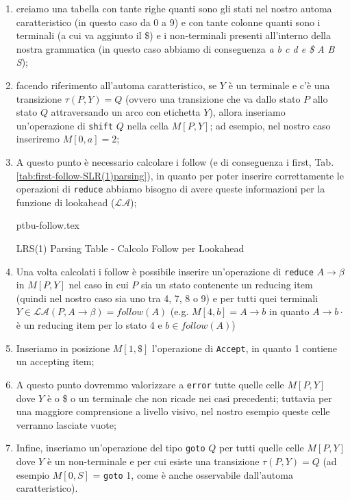 \documentclass[class=book, crop=false, oneside, 12pt]{standalone}
\begin{document}
\begin{enumerate}
    \item creiamo una tabella con tante righe quanti sono gli stati nel nostro automa caratteristico (in questo caso da 0 a 9) e con tante colonne quanti sono i terminali (a cui va aggiunto il \$) e i non-terminali presenti all'interno della nostra grammatica (in questo caso abbiamo di conseguenza \emph{a b c d e \$ A B S});
    \item facendo riferimento all'automa caratteristico, se \(Y\) è un terminale e c'è una transizione \(\tau (P, Y) = Q\) (ovvero una transizione che va dallo stato \(P\) allo stato \(Q\) attraversando un arco con etichetta \(Y\)), allora inseriamo un'operazione di \texttt{shift} \(Q\) nella cella \(M[P, Y]\); ad esempio, nel nostro caso inseriremo \(M[0, a] = 2\);
    \item A questo punto è necessario calcolare i follow (e di conseguenza i first, Tab.\ref{tab:first-follow-SLR(1)parsing}), in quanto per poter inserire correttamente le operazioni di \texttt{reduce} abbiamo bisogno di avere queste informazioni per la funzione di lookahead (\(\mathcal{LA}\));
\begin{table}[H]
    \centering
    {ptbu-follow.tex}
    \caption{LRS(1) Parsing Table - Calcolo Follow per Lookahead}
    \label{tab:first-follow-SLR(1)parsing}
\end{table}
    \item Una volta calcolati i follow è possibile inserire un'operazione di \texttt{reduce} \(A \rightarrow \beta\) in \(M[P, Y]\) nel caso in cui \(P\) sia un stato contenente un reducing item (quindi nel nostro caso sia uno tra 4, 7, 8 o 9) e per tutti quei terminali \(Y \in \mathcal{LA}(P, A \rightarrow \beta) = follow(A)\) (e.g. \(M[4, b] = A \rightarrow b\) in quanto \(A \rightarrow b \cdot\) è un reducing item per lo stato 4 e \(b \in follow(A)\))
    \item Inseriamo in posizione \(M[1, \$]\) l'operazione di \texttt{Accept}, in quanto 1 contiene un accepting item;
    \item A questo punto dovremmo valorizzare a \texttt{error} tutte quelle celle \(M[P, Y]\) dove \(Y\) è o \$ o un terminale che non ricade nei casi precedenti; tuttavia per una maggiore comprensione a livello visivo, nel nostro esempio queste celle verranno lasciate vuote;
    \item Infine, inseriamo un'operazione del tipo \texttt{goto} \(Q\) per tutti quelle celle \(M[P, Y]\) dove \(Y\) è un non-terminale e per cui esiste una transizione \(\tau(P, Y) = Q\) (ad esempio \(M[0, S]\) = \texttt{goto} 1, come è anche osservabile dall'automa caratteristico).
\end{enumerate}
\end{document}
